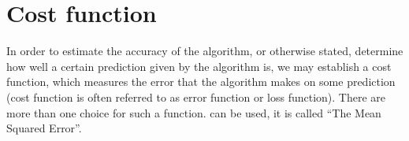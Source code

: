 %
%
%
%
%
%
%


\section{Cost function}\label{cost}

In order to estimate the accuracy of the algorithm, or otherwise stated, determine how well a certain prediction given by the algorithm is, we may establish a cost function, which measures the error that the algorithm makes on some prediction (cost function is often referred to as error function or loss function). There are more than one choice for such a function.  can be used, it is called ``The Mean Squared Error''.

